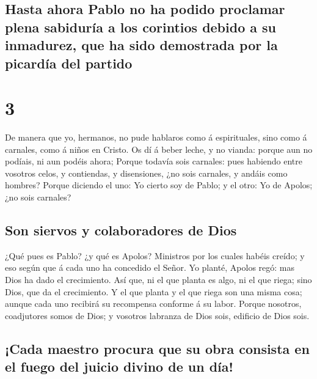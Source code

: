 \hypertarget{hasta-ahora-pablo-no-ha-podido-proclamar-plena-sabiduruxeda-a-los-corintios-debido-a-su-inmadurez-que-ha-sido-demostrada-por-la-picarduxeda-del-partido}{%
\subsection{Hasta ahora Pablo no ha podido proclamar plena sabiduría a
los corintios debido a su inmadurez, que ha sido demostrada por la
picardía del
partido}\label{hasta-ahora-pablo-no-ha-podido-proclamar-plena-sabiduruxeda-a-los-corintios-debido-a-su-inmadurez-que-ha-sido-demostrada-por-la-picarduxeda-del-partido}}

\hypertarget{section-2}{%
\section{3}\label{section-2}}

 De manera que yo, hermanos, no pude hablaros como á
espirituales, sino como á carnales, como á niños en Cristo.
 Os dí á beber leche, y no vianda: porque aun no podíais,
ni aun podéis ahora;  Porque todavía sois carnales: pues
habiendo entre vosotros celos, y contiendas, y disensiones, ¿no sois
carnales, y andáis como hombres?  Porque diciendo el uno:
Yo cierto soy de Pablo; y el otro: Yo de Apolos; ¿no sois carnales?

\hypertarget{son-siervos-y-colaboradores-de-dios}{%
\subsection{Son siervos y colaboradores de
Dios}\label{son-siervos-y-colaboradores-de-dios}}

 ¿Qué pues es Pablo? ¿y qué es Apolos? Ministros por los
cuales habéis creído; y eso según que á cada uno ha concedido el Señor.
 Yo planté, Apolos regó: mas Dios ha dado el crecimiento.
 Así que, ni el que planta es algo, ni el que riega; sino
Dios, que da el crecimiento.  Y el que planta y el que
riega son una misma cosa; aunque cada uno recibirá su recompensa
conforme á su labor.  Porque nosotros, coadjutores somos
de Dios; y vosotros labranza de Dios sois, edificio de Dios sois.

\hypertarget{cada-maestro-procura-que-su-obra-consista-en-el-fuego-del-juicio-divino-de-un-duxeda}{%
\subsection{¡Cada maestro procura que su obra consista en el fuego del
juicio divino de un
día!}\label{cada-maestro-procura-que-su-obra-consista-en-el-fuego-del-juicio-divino-de-un-duxeda}}

